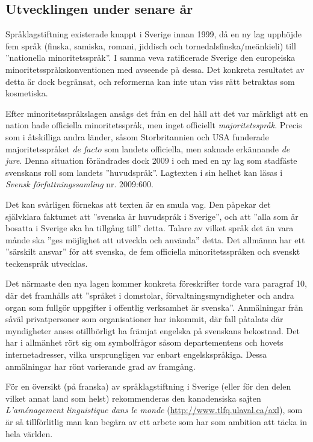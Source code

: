 \begin{multicols}{2}
\subsection{Utvecklingen under senare år}

Språklagstiftning existerade knappt i Sverige innan 1999, då en ny lag
upphöjde fem språk (finska, samiska, romani, jiddisch och
tornedalsfinska/meänkieli) till ''nationella minoritetsspråk''. I samma
veva ratificerade Sverige den europeiska minoritetsspråkskonventionen
med avseende på dessa. Det konkreta resultatet av detta är dock
begränsat, och reformerna kan inte utan viss rätt betraktas som
kosmetiska.

Efter minoritetsspråkslagen ansågs det från en del håll att det var
märkligt att en nation hade officiella minoritetsspråk, men inget
officiellt \textit{majoritetsspråk}. Precis som i åtskilliga andra
länder, såsom Storbritannien och USA funderade majoritetsspråket
\textit{de facto} som landets officiella, men saknade erkännande
\textit{de jure}. Denna situation förändrades dock 2009 i och med en
ny lag som stadfäste svenskans roll som landets
''huvudspråk''. Lagtexten i sin helhet kan läsas i \emph{Svensk
  författningssamling} nr. 2009:600\cite{spraklag1}.

Det kan svårligen förnekas att texten är en smula vag. Den påpekar det
självklara faktumet att ''svenska är huvudspråk i Sverige'', och att
''alla som är bosatta i Sverige ska ha tillgång till'' detta. Talare
av vilket språk det än vara månde ska ''ges möjlighet att utveckla och
använda'' detta. Det allmänna har ett ''särskilt ansvar'' för att
svenska, de fem officiella minoritetsspråken och svenskt teckenspråk
utvecklas.

Det närmaste den nya lagen kommer konkreta föreskrifter torde vara
paragraf 10, där det framhålls att ''språket i domstolar,
förvaltningsmyndigheter och andra organ som fullgör uppgifter i
offentlig verksamhet är svenska''. Anmälningar från såväl
privatpersoner som organisationer har inkommit, där fall påtalats där
myndigheter anses otillbörligt ha främjat engelska på svenskans
bekostnad. Det har i allmänhet rört sig om symbolfrågor såsom
departementens och hovets internetadresser, vilka ursprungligen var
enbart engelskspråkiga. Dessa anmälningar har rönt varierande grad av
framgång.

För en översikt (på franska) av språklagstiftning i Sverige (eller för
den delen vilket annat land som helst) rekommenderas den kanadensiska
sajten \textit{L'aménagement linguistique dans le
  monde} (\url{http://www.tlfq.ulaval.ca/axl}), som är så
tillförlitlig man kan begära av ett arbete som har som ambition att
täcka in hela världen.


\end{multicols}
